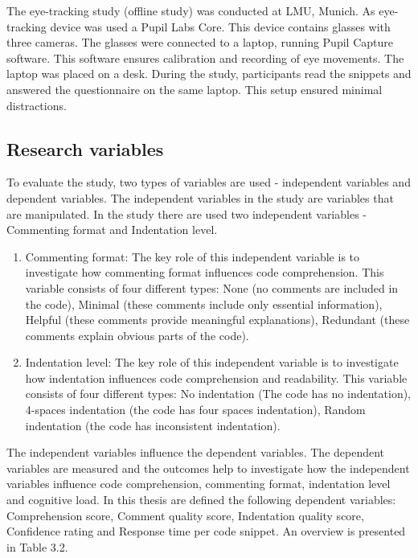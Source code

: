The eye-tracking study (offline study) was conducted at LMU, Munich. As eye-tracking device was used a Pupil Labs Core. This device contains glasses with three cameras. The glasses were connected to a laptop, running Pupil Capture software. This software ensures calibration and recording of eye movements. The laptop was placed on a desk. During the study, participants read the snippets and answered the questionnaire on the same laptop. This setup ensured minimal distractions. 


\subsection{Research variables}
To evaluate the study, two types of variables are used - independent variables and dependent variables. The independent variables in the study are variables that are manipulated. In the study there are used two independent variables - Commenting format and Indentation level.

\begin{enumerate}
     \item Commenting format: The key role of this independent variable is to investigate how commenting format influences code comprehension. This variable consists of four different types: None (no comments are included in the code), Minimal (these comments include only essential information), Helpful (these comments provide meaningful explanations), Redundant (these comments explain obvious parts of the code). 

    \item Indentation level: The key role of this independent variable is to investigate how indentation influences code comprehension and readability. This variable consists of four different types: No indentation (The code has no indentation), 4-spaces indentation (the code has four spaces indentation), Random indentation (the code has inconsistent indentation). 
\end{enumerate}


The independent variables influence the dependent variables. The dependent variables are measured and the outcomes help to investigate how the independent variables influence code comprehension, commenting format, indentation level and cognitive load.  In this thesis are defined the following dependent variables: Comprehension score, Comment quality score, Indentation quality score, Confidence rating and  Response time per code snippet. An overview is presented in Table 3.2.


